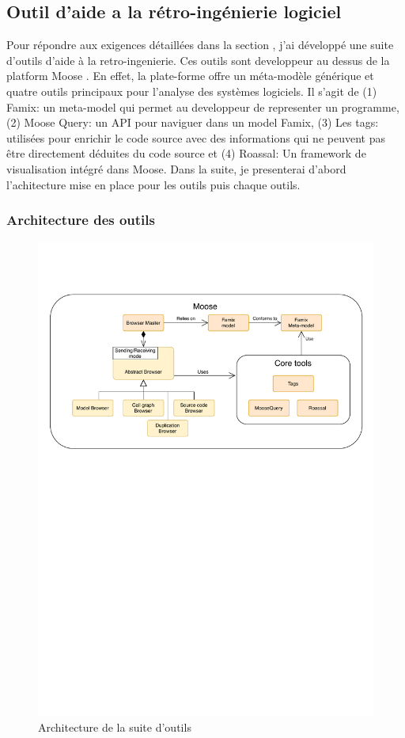 \documentclass[a4paper]{article}
\begin{document}
\subsection{Outil d'aide a la rétro-ingénierie logiciel}
Pour répondre aux exigences détaillées dans la section , j'ai développé une suite d'outils d'aide à la retro-ingenierie.
Ces outils sont developpeur au dessus de la platform Moose \cite{Nier05c}.
En effet, la plate-forme offre un méta-modèle générique et quatre outils principaux pour l'analyse des systèmes logiciels.
Il s'agit de (1) Famix: un meta-model qui permet au developpeur de representer un programme, (2) Moose Query: un API pour naviguer dans un model Famix,
(3) Les tags: utilisées pour enrichir le code source avec des informations qui ne peuvent pas être directement déduites du code source et 
(4) Roassal: Un framework de visualisation intégré dans Moose.
Dans la suite, je presenterai d'abord l'achitecture mise en place pour les outils puis  chaque outils.


\subsubsection{Architecture des outils }
\begin{figure}[htbp]
  \begin{center}
  \includegraphics[width=0.7\linewidth]{./figures/architecture.pdf}
  \caption{Architecture de la suite d'outils}
  \label{fig:applicationArchitecture}
  \end{center}
  \vspace{-0.3cm}
\end{figure}
\end{document}
